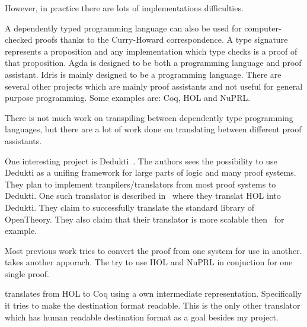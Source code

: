 However, in practice there are lots of implementations difficulties.

A dependently typed programming language can also be used for computer-checked
proofs thanks to the Curry-Howard correspondence. A type signature represents
a proposition and any implementation which type checks is a proof of that
proposition. Agda is designed to be both a programming language and proof
assistant. Idris is mainly designed to be a programming language. There are
several other projects which are mainly proof assistants and not useful for
general purpose programming. Some examples are: Coq, HOL and NuPRL.

There is not much work on transpiling between dependently type programming
languages, but there are a lot of work done on translating between different
proof assistants.

One interesting project is Dedukti~\cite{assaf2016dedukti}. The authors sees
the possibility to use Dedukti as a unifing framework for large parts of logic
and many proof systems. They plan to implement tranpilers/translators from most
proof systems to Dedukti. One such translator is described
in~\cite{assaf2015translating} where they translat HOL into Dedukti. They claim
to successfully translate the standard library of OpenTheory. %
They also claim that their translator is more scalable
then~\cite{obua2006importing} for example.

Most previous work tries to convert the proof from one system for use in
another. \cite{felty1997hybrid} takes another apporach. The try to use HOL and
NuPRL in conjuction for one single proof.

\cite{denney2000prototype} translates from HOL to Coq using a own intermediate
representation. Specifically it tries to make the destination format readable.
This is the only other translator which has human readable destination format
as a goal besides my project.

